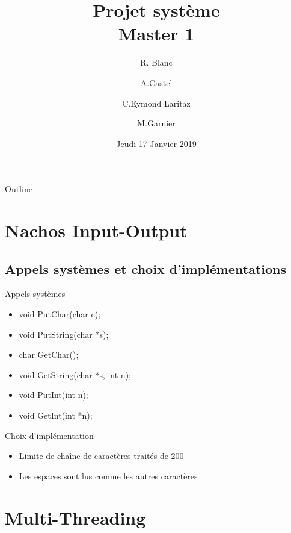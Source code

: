 \documentclass{beamer}
\title{Projet système\\Master 1}
\author{R. Blanc \and A.Castel \and C.Eymond Laritaz \and M.Garnier}
\institute[Université Grenoble Alpes] %
{
  UFR IM²AG\\
  Université Grenoble Alpes
}
\date{Jeudi 17 Janvier 2019}
\begin{document}
\begin{frame}
  \titlepage
\end{frame}

\begin{frame}{Outline}
  \tableofcontents%
\end{frame}


\section{Nachos Input-Output}
\subsection{Appels systèmes et choix d’implémentations }
\begin{frame}
	\begin{block}{Appels systèmes}
		\begin{itemize}
			\item void PutChar(char c);
			\item void PutString(char *s);
			\item char GetChar();
			\item void GetString(char *s, int n);
			\item void PutInt(int n);
			\item void GetInt(int *n);
		\end{itemize}
	\end{block}
	\begin{block}{Choix d’implémentation}
		\begin{itemize}
			\item Limite de chaîne de caractères traités de 200
			\item Les espaces sont lus comme les autres caractères 
		\end{itemize}		
	\end{block}
\end{frame}







\section{Multi-Threading}
\end{document}
